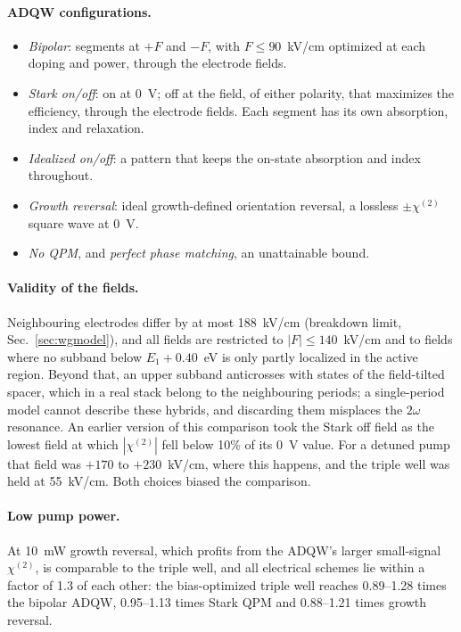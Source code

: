 \documentclass[11pt]{article}
\newcommand{\chitwo}{\chi^{(2)}}
\begin{document}
\paragraph{ADQW configurations.}
\begin{itemize}
\item \emph{Bipolar}: segments at $+F$ and $-F$, with $F\le90$~kV/cm optimized at each doping and power, through the electrode fields.
\item \emph{Stark on/off}: on at 0~V; off at the field, of either polarity, that maximizes the efficiency, through the electrode fields. Each segment has its own absorption, index and relaxation.
\item \emph{Idealized on/off}: a pattern that keeps the on-state absorption and index throughout.
\item \emph{Growth reversal}: ideal growth-defined orientation reversal, a lossless $\pm\chitwo$ square wave at 0~V.
\item \emph{No QPM}, and \emph{perfect phase matching}, an unattainable bound.
\end{itemize}

\paragraph{Validity of the fields.} Neighbouring electrodes differ by at most 188~kV/cm (breakdown limit, Sec.~\ref{sec:wgmodel}), and all fields are restricted to $|F|\le140$~kV/cm and to fields where no subband below $E_1+0.40$~eV is only partly localized in the active region. Beyond that, an upper subband anticrosses with states of the field-tilted spacer, which in a real stack belong to the neighbouring periods; a single-period model cannot describe these hybrids, and discarding them misplaces the $2\omega$ resonance. An earlier version of this comparison took the Stark off field as the lowest field at which $|\chitwo|$ fell below 10\% of its 0~V value. For a detuned pump that field was $+170$ to $+230$~kV/cm, where this happens, and the triple well was held at 55~kV/cm. Both choices biased the comparison.

\paragraph{Low pump power.} At 10~mW growth reversal, which profits from the ADQW's larger small-signal $\chitwo$, is comparable to the triple well, and all electrical schemes lie within a factor of 1.3 of each other: the bias-optimized triple well reaches 0.89--1.28 times the bipolar ADQW, 0.95--1.13 times Stark QPM and 0.88--1.21 times growth reversal.
\end{document}
